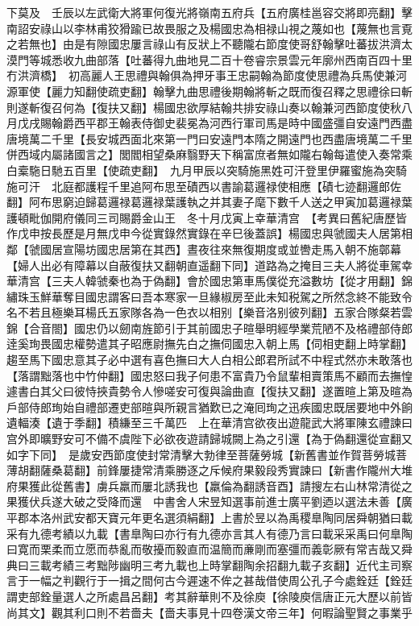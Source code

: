 下莫及　壬辰以左武衛大將軍何復光將嶺南五府兵【五府廣桂邕容交將即亮翻】擊南詔安祿山以李林甫狡猾踰已故畏服之及楊國忠為相禄山視之蔑如也【蔑無也言覔之若無也】由是有隙國忠屢言祿山有反狀上不聽隴右節度使哥舒翰擊吐蕃拔洪濟太漠門等城悉收九曲部落【吐蕃得九曲地見二百十卷睿宗景雲元年廓州西南百四十里冇洪濟橋】　初高麗人王思禮與翰俱為押牙事王忠嗣翰為節度使思禮為兵馬使兼河源軍使【麗力知翻使疏吏翻】翰擊九曲思禮後期翰將斬之既而復召釋之思禮徐曰斬則遂斬復召何為【復扶又翻】楊國忠欲厚結翰共排安祿山奏以翰兼河西節度使秋八月戊戌賜翰爵西平郡王翰表侍御史裴冕為河西行軍司馬是時中國盛彊自安遠門西盡唐境萬二千里【長安城西面北來第一門曰安遠門本隋之開遠門也西盡唐境萬二千里併西域内屬諸國言之】閭閻相望桑麻翳野天下稱富庶者無如隴右翰每遣使入奏常乘白槖駞日馳五百里【使疏吏翻】　九月甲辰以突騎施黑姓可汗登里伊羅蜜施為突騎施可汗　北庭都護程千里追阿布思至磧西以書諭葛邏禄使相應【磧七迹翻邏郎佐翻】阿布思窮迫歸葛邏禄葛邏禄葉護執之并其妻子麾下數千人送之甲寅加葛邏禄葉護頓毗伽開府儀同三司賜爵金山王　冬十月戊寅上幸華清宫　【考異曰舊紀唐歷皆作戊申按長歷是月無戊申今從實錄然實錄在辛巳後蓋誤】楊國忠與虢國夫人居第相鄰【虢國居宣陽坊國忠居第在其西】晝夜往來無復期度或並轡走馬入朝不施鄣幕【婦人出必有障幕以自蔽復扶又翻朝直遥翻下同】道路為之掩目三夫人將從車駕幸華清宫【三夫人韓虢秦也為于偽翻】會於國忠第車馬僕從充溢數坊【從才用翻】錦繡珠玉鮮華奪目國忠謂客曰吾本寒家一旦緣椒房至此未知税駕之所然念終不能致令名不若且極樂耳楊氏五家隊各為一色衣以相别【樂音洛别彼列翻】五家合隊粲若雲錦【合音閤】國忠仍以劒南旌節引于其前國忠子暄舉明經學業荒陋不及格禮部侍郎逹奚珣畏國忠權勢遣其子昭應尉撫先白之撫伺國忠入朝上馬【伺相吏翻上時掌翻】趨至馬下國忠意其子必中選有喜色撫曰大人白相公郎君所試不中程式然亦未敢落也【落謂黜落也中竹仲翻】國忠怒曰我子何患不富貴乃令鼠輩相賣策馬不顧而去撫惶遽書白其父曰彼恃挾貴勢令人慘嗟安可復與論曲直【復扶又翻】遂置暄上第及暄為戶部侍郎珣始自禮部遷吏部暄與所親言猶歎已之淹囘珣之迅疾國忠既居要地中外餉遺輻湊【遺于季翻】積縑至三千萬匹　上在華清宫欲夜出遊龍武大將軍陳玄禮諫曰宫外即曠野安可不備不虞陛下必欲夜遊請歸城闕上為之引還【為于偽翻還從宣翻又如字下同】　是歲安西節度使封常清擊大勃律至菩薩勞城【新舊書並作賀菩勞城菩薄胡翻薩桑葛翻】前鋒屢捷常清乘勝逐之斥候府果毅段秀實諫曰【新書作隴州大堆府果獲此從舊書】虜兵羸而屢北誘我也【羸倫為翻誘音酉】請搜左右山林常清從之果獲伏兵遂大破之受降而還　中書舍人宋昱知選事前進士廣平劉迺以選法未善【廣平郡本洛州武安都天寶元年更名選須絹翻】上書於昱以為禹稷臯陶同居舜朝猶曰載采有九德考績以九載【書臯陶曰亦行有九德亦言其人有德乃言曰載采采禹曰何臯陶曰寛而栗柔而立愿而恭亂而敬擾而毅直而温簡而亷剛而塞彊而義彰厥有常吉哉又舜典曰三載考績三考黜陟幽明三考九載也上時掌翻陶余招翻九載子亥翻】近代主司察言于一幅之判觀行于一揖之間何古今遲速不侔之甚哉借使周公孔子今處銓廷【銓廷謂吏部銓量選人之所處昌呂翻】考其辭華則不及徐庾【徐陵庾信唐正元大歷以前皆尚其文】觀其利口則不若嗇夫【嗇夫事見十四卷漢文帝三年】何暇論聖賢之事業乎

